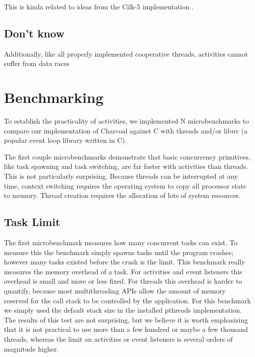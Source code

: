 \documentclass[10pt,preprint]{sigplanconf}
\begin{document}
This is kinda related to ideas from the Cilk-5 implementation
\cite{Frigo1998}.

\subsection{Don't know}

Additionally, like all properly implemented cooperative threads, activities cannot suffer from data races

\cite{Boehm2011}

\section{Benchmarking}

To establish the practicality of activities, we implemented N
microbenchmarks to compare our implementation of Charcoal against C with
threads and/or libuv (a popular event loop library written in C).

The first couple microbenchmarks demonstrate that basic concurrency primitives, like task spawning and task switching, are far faster with activities than threads.
This is not particularly surprising.
Because threads can be interrupted at any time, context switching requires the operating system to copy all processor state to memory.
Thread creation requires the allocation of lots of system resources.

\subsection{Task Limit}

The first microbenchmark measures how many concurrent tasks can exist.
To measure this the benchmark simply spawns tasks until the program crashes; however many tasks existed before the crash is the limit.
This benchmark really measures the memory overhead of a task.
For activities and event listeners this overhead is small and more or less fixed.
For threads this overhead is harder to quantify, because most multithreading APIs allow the amount of memory reserved for the call stack to be controlled by the application.
For this benchmark we simply used the default stack size in the installed pthreads implementation.
The results of this test are not surprising, but we believe it is worth emphasizing that it is not practical to use more than a few hundred or maybe a few thousand threads, whereas the limit on activities or event listeners is several orders of magnitude higher.
\end{document}
